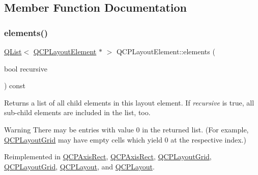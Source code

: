 \subsection{Member Function Documentation}
\mbox{\label{class_q_c_p_layout_element_a76dec8cb31e498994a944d7647a43309}} 
\subsubsection{\texorpdfstring{elements()}{elements()}}
{\footnotesize\ttfamily \hyperlink{class_q_list}{Q\+List}$<$ \hyperlink{class_q_c_p_layout_element}{Q\+C\+P\+Layout\+Element} $\ast$ $>$ Q\+C\+P\+Layout\+Element\+::elements (\begin{DoxyParamCaption}\item[{bool}]{recursive }\end{DoxyParamCaption}) const\hspace{0.3cm}{\ttfamily [virtual]}}

Returns a list of all child elements in this layout element. If {\itshape recursive} is true, all sub-\/child elements are included in the list, too.

\begin{DoxyWarning}{Warning}
There may be entries with value 0 in the returned list. (For example, \hyperlink{class_q_c_p_layout_grid}{Q\+C\+P\+Layout\+Grid} may have empty cells which yield 0 at the respective index.) 
\end{DoxyWarning}


Reimplemented in \hyperlink{class_q_c_p_axis_rect_a3aee067fd105f2fa8de9eb8024435ac5}{Q\+C\+P\+Axis\+Rect}, \hyperlink{class_q_c_p_axis_rect_a516deca38a227006634ecb0456096982}{Q\+C\+P\+Axis\+Rect}, \hyperlink{class_q_c_p_layout_grid_a7d5b968b4cf57393e9e387976d91f8f7}{Q\+C\+P\+Layout\+Grid}, \hyperlink{class_q_c_p_layout_grid_adc2b77187862688f52796d208bd9756c}{Q\+C\+P\+Layout\+Grid}, \hyperlink{class_q_c_p_layout_aca129722c019f91d3367046f80abfa77}{Q\+C\+P\+Layout}, and \hyperlink{class_q_c_p_layout_a15d7ab417316952a13bed428819af690}{Q\+C\+P\+Layout}.

\mbox{\label{class_q_c_p_layout_element_a4efdcbde9d28f410e5ef166c9d691deb}} 
